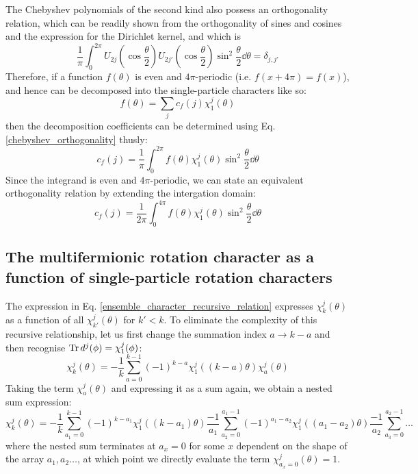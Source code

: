 \documentclass[12pt]{article}
\begin{document}
	The Chebyshev polynomials of the second kind also possess an orthogonality relation, which can be readily shown from the orthogonality of sines and cosines and the expression for the Dirichlet kernel, and which is
	\begin{equation} \label{chebyshev_orthogonality}
	\frac{1}{\pi}\int_0^{2\pi} U_{2j}\left(\cos{\frac{\theta}{2}}\right)U_{2j'}\left(\cos{\frac{\theta}{2}}\right) \sin^2{\frac{\theta}{2}}\dd \theta = \delta_{j,j'}
	\end{equation}
	Therefore, if a function $f(\theta)$ is even and $4\pi$-periodic (i.e. $f(x+4\pi)=f(x)$), and hence can be decomposed into the single-particle characters like so:
	\begin{equation}
	f(\theta) = \sum_j c_f(j) \chi^j_1(\theta)
	\end{equation}
	then the decomposition coefficients can be determined using Eq. \ref{chebyshev_orthogonality} thusly:
	\begin{equation}
	c_f(j) = \frac{1}{\pi} \int_0^{2\pi} f(\theta) \chi^j_1(\theta) \sin^2{\frac{\theta}{2}}\dd \theta
	\end{equation}
	Since the integrand is even and $4\pi$-periodic, we can state an equivalent orthogonality relation by extending the intergation domain:
	\begin{equation} \label{orthogonality_four_pi}
	c_f(j) = \frac{1}{2\pi} \int_0^{4\pi} f(\theta) \chi^j_1(\theta) \sin^2{\frac{\theta}{2}}\dd \theta
	\end{equation}
	
	\subsection{The multifermionic rotation character as a function of single-particle rotation characters}
	The expression in Eq. \ref{ensemble_character_recursive_relation} expresses $\chi^j_k(\theta)$ as a function of all $\chi^j_{k'}(\theta)$ for $k'<k$. To eliminate the complexity of this recursive relationship, let us first change the summation index $a\rightarrow k-a$ and then recognise $\Tr d^j(\phi)=\chi^j_1(\phi)$:
	\begin{equation}
	\chi^j_k(\theta)=-\frac{1}{k}\sum_{a=0}^{k-1} (-1)^{k-a}\chi^j_1((k-a)\theta)\chi^j_{a}(\theta)
	\end{equation}
	Taking the term $\chi^j_{a}(\theta)$ and expressing it as a sum again, we obtain a nested sum expression:
	\begin{equation} \label{nested_sum_a}
	\chi^j_k(\theta)=-\frac{1}{k}\sum_{a_1=0}^{k-1} (-1)^{k-a_1}\chi^j_1((k-a_1)\theta)\frac{-1}{a_1}\sum_{a_2=0}^{a_1-1} (-1)^{a_1-a_2}\chi^j_1((a_1-a_2)\theta)\frac{-1}{a_2}\sum_{a_3=0}^{a_2-1}\dots
	\end{equation}
	where the nested sum terminates at $a_x=0$ for some $x$ dependent on the shape of the array $a_1, a_2\dots$, at which point we directly evaluate the term $\chi^j_{a_x=0}(\theta)=1$.
	
\end{document}
